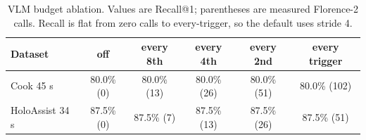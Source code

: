 \begin{table}[t]
  \centering
  \caption{VLM budget ablation. Values are Recall@1; parentheses are measured
  Florence-2 calls. Recall is flat from zero calls to every-trigger, so the
  default uses stride 4.}
  \label{tab:vlm-budget}
  \begin{tabular}{lccccc}
    \toprule
    Dataset & off & every 8th & every 4th & every 2nd & every trigger \\
    \midrule
    Cook 45 s & 80.0\% (0) & 80.0\% (13) & 80.0\% (26) & 80.0\% (51) & 80.0\% (102) \\
    HoloAssist 34 s & 87.5\% (0) & 87.5\% (7) & 87.5\% (13) & 87.5\% (26) & 87.5\% (51) \\
    \bottomrule
  \end{tabular}
\end{table}
